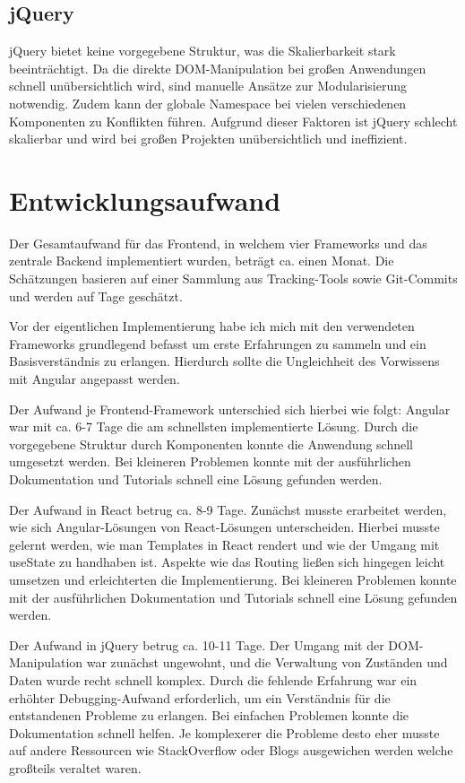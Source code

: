 \documentclass[oneside]{ausarbeitung}
\begin{document}
\subsection{jQuery}

jQuery bietet keine vorgegebene Struktur, was die Skalierbarkeit stark beeinträchtigt. Da die direkte DOM-Manipulation bei großen Anwendungen schnell unübersichtlich wird, sind manuelle Ansätze zur Modularisierung notwendig. Zudem kann der globale Namespace bei vielen verschiedenen Komponenten zu Konflikten führen. Aufgrund dieser Faktoren ist jQuery schlecht skalierbar und wird bei großen Projekten unübersichtlich und ineffizient.

\section{Entwicklungsaufwand}

Der Gesamtaufwand für das Frontend, in welchem vier Frameworks und das zentrale Backend implementiert wurden, beträgt ca. einen Monat. Die Schätzungen basieren auf einer Sammlung aus Tracking-Tools sowie Git-Commits und werden auf Tage geschätzt.

Vor der eigentlichen Implementierung habe ich mich mit den verwendeten Frameworks grundlegend befasst um erste Erfahrungen zu sammeln und ein Basisverständnis zu erlangen. Hierdurch sollte die Ungleichheit des Vorwissens mit Angular angepasst werden.

Der Aufwand je Frontend-Framework unterschied sich hierbei wie folgt: Angular war mit ca. 6-7 Tage die am schnellsten implementierte Lösung. Durch die vorgegebene Struktur durch Komponenten konnte die Anwendung schnell umgesetzt werden. Bei kleineren Problemen konnte mit der ausführlichen Dokumentation und Tutorials schnell eine Lösung gefunden werden.

Der Aufwand in React betrug ca. 8-9 Tage. Zunächst musste erarbeitet werden, wie sich Angular-Lösungen von React-Lösungen unterscheiden. Hierbei musste gelernt werden, wie man Templates in React rendert und wie der Umgang mit useState zu handhaben ist. Aspekte wie das Routing ließen sich hingegen leicht umsetzen und erleichterten die Implementierung. Bei kleineren Problemen konnte mit der ausführlichen Dokumentation und Tutorials schnell eine Lösung gefunden werden.

Der Aufwand in jQuery betrug ca. 10-11 Tage. Der Umgang mit der DOM-Manipulation war zunächst ungewohnt, und die Verwaltung von Zuständen und Daten wurde recht schnell komplex. Durch die fehlende Erfahrung war ein erhöhter Debugging-Aufwand erforderlich, um ein Verständnis für die entstandenen Probleme zu erlangen. Bei einfachen Problemen konnte die Dokumentation schnell helfen. Je komplexerer die Probleme desto eher musste auf andere Ressourcen wie StackOverflow oder Blogs ausgewichen werden welche großteils veraltet waren.  
\end{document}
